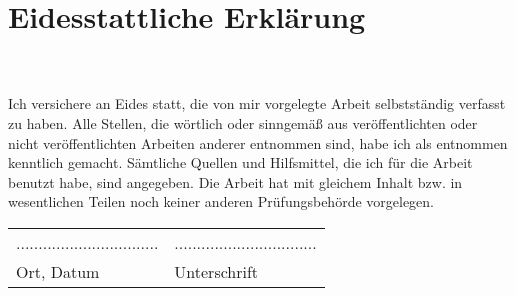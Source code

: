 \section*{Eidesstattliche Erklärung}
\ThesisAuthor \\
\ThesisAuthorAddress \\
\newline
Ich versichere an Eides statt, die von mir vorgelegte Arbeit selbstständig verfasst zu haben. Alle Stellen, die wörtlich oder sinngemäß aus veröffentlichten oder nicht veröffentlichten Arbeiten anderer entnommen sind, habe ich als entnommen kenntlich gemacht. Sämtliche Quellen und Hilfsmittel, die ich für die Arbeit benutzt habe, sind angegeben. Die Arbeit hat mit gleichem Inhalt bzw. in wesentlichen Teilen noch keiner anderen Prüfungsbehörde vorgelegen.
\newline


\begin{tabular}{ll}
................................ & ................................ \\ 
Ort, Datum & Unterschrift
\end{tabular}
